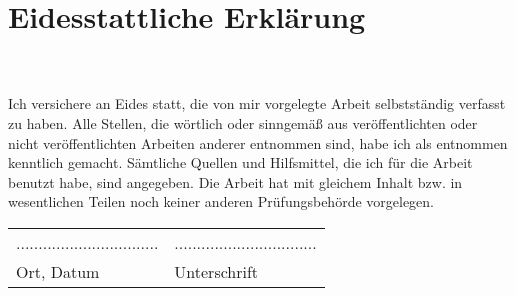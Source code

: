 \section*{Eidesstattliche Erklärung}
\ThesisAuthor \\
\ThesisAuthorAddress \\
\newline
Ich versichere an Eides statt, die von mir vorgelegte Arbeit selbstständig verfasst zu haben. Alle Stellen, die wörtlich oder sinngemäß aus veröffentlichten oder nicht veröffentlichten Arbeiten anderer entnommen sind, habe ich als entnommen kenntlich gemacht. Sämtliche Quellen und Hilfsmittel, die ich für die Arbeit benutzt habe, sind angegeben. Die Arbeit hat mit gleichem Inhalt bzw. in wesentlichen Teilen noch keiner anderen Prüfungsbehörde vorgelegen.
\newline


\begin{tabular}{ll}
................................ & ................................ \\ 
Ort, Datum & Unterschrift
\end{tabular}
